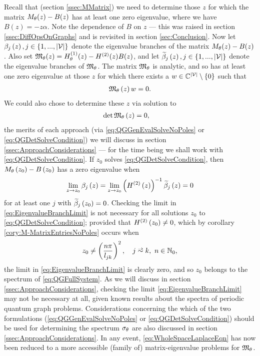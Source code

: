 Recall that (section \ref{ssec:MMatrix}) we need to determine those $z$ for which the matrix $M_\theta(z)-B(z)$ has at least one zero eigenvalue, where we have $B(z) = -z\alpha$.
Note the dependence of $B$ on $z$ --- this was raised in section \ref{ssec:DiffOpsOnGraphs} and is revisited in section \ref{sec:Conclusion}.
Now let $\beta_j\left( z \right), j\in\left\{ 1,...,\left\lvert \mathcal{V} \right\rvert \right\}$ denote the eigenvalue branches of the matrix $M_\theta(z)-B(z)$.
Also set $\mathfrak{M}_\theta(z) = H^{(1)}_\theta(z) - H^{(2)}(z)B(z)$, and let $\widetilde{\beta}_j\left( z \right), j\in\left\{ 1,...,\left\lvert \mathcal{V} \right\rvert \right\}$ denote the eigenvalue branches of $\mathfrak{M}_\theta$.
The matrix $\mathfrak{M}_\theta$ is analytic, and so has at least one zero eigenvalue at those $z$ for which there exists a $w\in\mathbb{C}^{\left\lvert \mathcal{V} \right\rvert}\setminus\left\{ 0 \right\}$ such that
\begin{align} \label{eq:QGGenEvalSolveNoPoles}
	\mathfrak{M}_\theta\left( z \right)w = 0.
\end{align}
We could also chose to determine these $z$ via solution to 
\begin{align} \label{eq:QGDetSolveCondition}
	\det\mathfrak{M}_\theta\left( z \right) &= 0,
\end{align}
the merits of each approach (via \eqref{eq:QGGenEvalSolveNoPoles} or \eqref{eq:QGDetSolveCondition}) we will discuss in section \ref{ssec:ApproachConsiderations} --- for the time being we shall work with \eqref{eq:QGDetSolveCondition}.
If $z_0$ solves \eqref{eq:QGDetSolveCondition}, then $M_{\theta}\left( z_0 \right)-B\left( z_0 \right)$ has a zero eigenvalue when
\begin{align} \label{eq:EigenvalueBranchLimit}
	\lim_{z\rightarrow z_0} \beta_j\left( z \right) = \lim_{z\rightarrow z_0} \left(  H^{(2)}\left( z \right)  \right)^{-1} \widetilde{\beta}_j\left( z \right) = 0
\end{align}
for at least one $j$ with $\widetilde{\beta}_j\left( z_0 \right)=0$.
Checking the limit in \eqref{eq:EigenvalueBranchLimit} is not necessary for all solutions $z_0$ to \eqref{eq:QGDetSolveCondition}; provided that $H^{(2)}\left( z_0 \right)\neq 0$, which by corollary \ref{cory:M-MatrixEntriesNoPoles} occurs when
\begin{align*}
	z_0 \neq \bracs{ \frac{n\pi}{l_{jk}} }^2, \quad j\conLeft k, \ n\in\naturals_{0},
\end{align*}
the limit in \eqref{eq:EigenvalueBranchLimit} is clearly zero, and so $z_0$ belongs to the spectrum of \eqref{eq:QGFullSystem}.
As we will discuss in section \ref{ssec:ApproachConsiderations}, checking the limit \eqref{eq:EigenvalueBranchLimit} may not be necessary at all, given known results about the spectra of periodic quantum graph problems.
Considerations concerning the which of the two formulations (\eqref{eq:QGGenEvalSolveNoPoles} or \eqref{eq:QGDetSolveCondition}) should be used for determining the spectrum $\sigma_\theta$ are also discussed in section \ref{ssec:ApproachConsiderations}.
In any event, \eqref{eq:WholeSpaceLaplaceEqn} has now been reduced to a more accessible (family of) matrix-eigenvalue problems for $\mathfrak{M}_\theta$.

